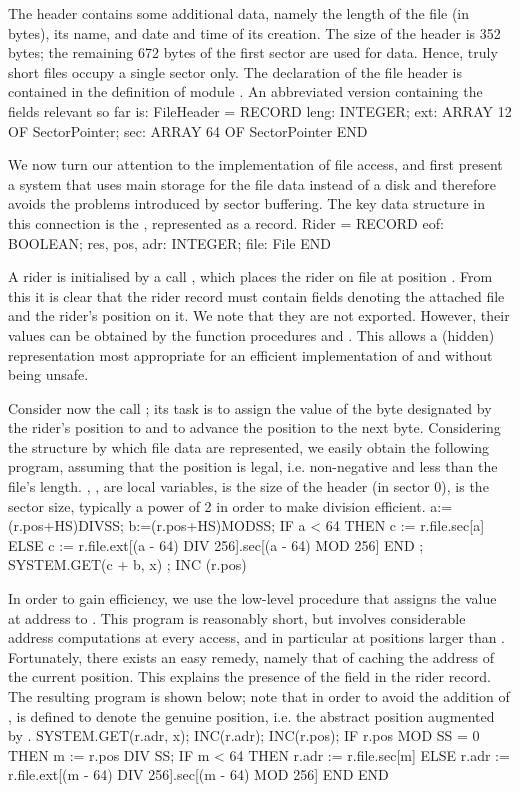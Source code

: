 The header contains some additional data, namely the length of the file (in bytes), its name, and date and time of its creation. The size of the header is 352 bytes; the remaining 672 bytes of the first sector are used for data. Hence, truly short files occupy a single sector only. The declaration of the file header is contained in the definition of module . An abbreviated version containing the fields relevant so far is:
\begintt
FileHeader = RECORD leng: INTEGER;
ext: ARRAY 12 OF SectorPointer;
sec: ARRAY 64 OF SectorPointer END
\endtt

\noindent We now turn our attention to the implementation of file access, and first present a system that uses main storage for the file data instead of a disk and therefore avoids the problems introduced by sector buffering. The key data structure in this connection is the , represented as a record.
\begintt
Rider = RECORD
eof: BOOLEAN; res, pos, adr: INTEGER; file: File
END
\endtt

\noindent A rider is initialised by a call , which places the rider  on file  at position . From this it is clear that the rider record must contain fields denoting the attached file and the rider's position on it. We note that they are not exported. However, their values can be obtained by the function procedures  and . This allows a (hidden) representation most appropriate for an efficient implementation of  and  without being unsafe.

Consider now the call ; its task is to assign the value of the byte designated by the rider's position to  and to advance the position to the next byte. Considering the structure by which file data are represented, we easily obtain the following program, assuming that the position is legal, i.e. non-negative and less than the file's length. , ,  are local variables,  is the size of the header (in sector 0),  is the sector size, typically a power of 2 in order to make division efficient.
\begintt
a:=(r.pos+HS)DIVSS; b:=(r.pos+HS)MODSS;
IF a < 64 THEN c := r.file.sec[a]
ELSE c := r.file.ext[(a - 64) DIV 256].sec[(a - 64) MOD 256] END ;
SYSTEM.GET(c + b, x) ; INC (r.pos)
\endtt

\noindent In order to gain efficiency, we use the low-level procedure  that assigns the value at address  to . This program is reasonably short, but involves considerable address computations at every access, and in particular at positions larger than . Fortunately, there exists an easy remedy, namely that of caching the address of the current position. This explains the presence of the field  in the rider record. The resulting program is shown below; note that in order to avoid the addition of ,  is defined to denote the genuine position, i.e. the abstract position augmented by .
\begintt
SYSTEM.GET(r.adr, x); INC(r.adr); INC(r.pos); IF r.pos MOD SS = 0 THEN
m := r.pos DIV SS;
IF m < 64 THEN r.adr := r.file.sec[m]
ELSE r.adr := r.file.ext[(m - 64) DIV 256].sec[(m - 64) MOD 256] END
END
\endtt

